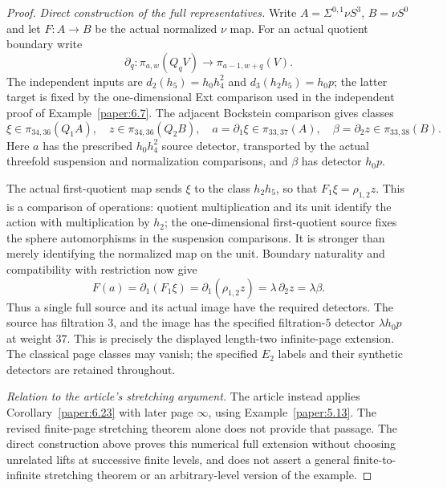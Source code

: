 \begin{proof}
\textit{Direct construction of the full representatives.}
Write $A=\Sigma^{0,1}\nu S^3$, $B=\nu S^0$ and let
$F:A\to B$ be the actual normalized $\nu$ map. For an actual quotient
boundary write
\[
\partial_q:\pi_{a,w}(Q_qV)\longrightarrow\pi_{a-1,w+q}(V).
\]
The independent inputs are $d_2(h_5)=h_0h_4^2$ and
$d_3(h_2h_5)=h_0p$; the latter target is fixed by the one-dimensional
Ext comparison used in the independent proof of Example~\ref{paper:6.7}.
The adjacent Bockstein comparison gives classes
\[
\xi\in\pi_{34,36}(Q_1A),\quad
z\in\pi_{34,36}(Q_2B),\quad
a=\partial_1\xi\in\pi_{33,37}(A),\quad
\beta=\partial_2z\in\pi_{33,38}(B).
\]
Here $a$ has the prescribed $h_0h_4^2$ source detector, transported by
the actual threefold suspension and normalization comparisons, and
$\beta$ has detector $h_0p$.

The actual first-quotient map sends $\xi$ to the class $h_2h_5$,
so that $F_1\xi=\rho_{1,2}z$. This is a comparison of operations:
quotient multiplication and its unit identify the action with
multiplication by $h_2$; the one-dimensional first-quotient source
fixes the sphere automorphisms in the suspension comparisons.
It is stronger than merely identifying the normalized map on the unit.
Boundary naturality and compatibility with restriction now give
\[
F(a)=\partial_1(F_1\xi)
     =\partial_1(\rho_{1,2}z)
     =\lambda\,\partial_2z=\lambda\beta.
\]
Thus a single full source and its actual image have the required
detectors. The source has filtration $3$, and the image has the
specified filtration-$5$ detector $\lambda h_0p$ at weight $37$.
This is precisely the displayed length-two infinite-page extension.
The classical page classes may vanish; the specified $E_2$ labels
and their synthetic detectors are retained throughout.

\textit{Relation to the article's stretching argument.}
The article instead applies Corollary~\ref{paper:6.23} with later page
$\infty$, using Example~\ref{paper:5.13}. The revised finite-page
stretching theorem alone does not provide that passage. The direct
construction above proves this numerical full extension without
choosing unrelated lifts at successive finite levels, and does not
assert a general finite-to-infinite stretching theorem or an
arbitrary-level version of the example.
\end{proof}

